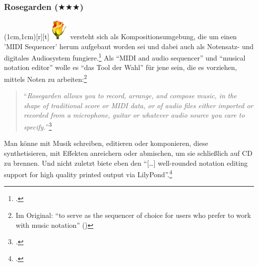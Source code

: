 %
%


\subsubsection{Rosegarden ($\bigstar\bigstar\bigstar$)}

\parpic(1cm,1cm)[r][t]{\includegraphics[width=1cm]{logos/rosegarden-300dpi.png}}
\label{Rosegarden} versteht sich als Kompositionsumgebung, die
um einen 'MIDI Sequencer' herum aufgebaut worden sei und dabei auch als
Notensatz- und digitales Audiosystem fungiere.\footcite[vgl.][\nopage
wp]{Rosegarden2019a} Als \enquote{MIDI and audio sequencer} und \enquote{musical
notation editor} wolle es \enquote{das Tool der Wahl} für jene sein, die es
vorziehen, mittels Noten zu arbeiten:\footnote{Im Original: \enquote{to serve as
the sequencer of choice for users who prefer to work with music notation}
(\cite[vgl.][\nopage wp]{Rosegarden2019c})}

\begin{quote}\enquote{\textit{Rosegarden allows you to record, arrange, and compose
music, in the shape of traditional score or MIDI data, or of audio files either
imported or recorded from a microphone, guitar or whatever audio source you care
to specify.}}\footcite[vgl.][\nopage wp]{Rosegarden2019c} \end{quote}

Man könne mit  Musik schreiben, editieren oder komponieren,
diese synthetisieren, mit Effekten anreichern oder abmischen, um sie schließlich
auf CD zu brennen. Und nicht zuletzt biete  eben den
\enquote{[\ldots] well-rounded notation editing support for high quality printed
output via LilyPond}.\footcite[vgl.][\nopage wp]{Rosegarden2019c}

